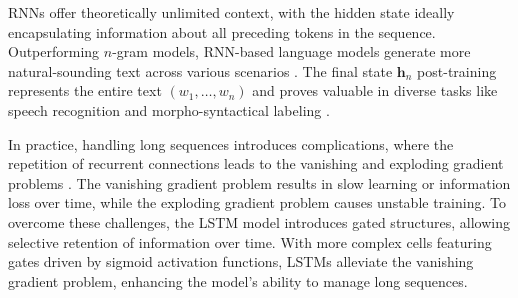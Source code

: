 




\acp{RNN} offer theoretically unlimited context, with the hidden state ideally encapsulating information about all preceding tokens in the sequence. Outperforming $n$-gram models, \ac{RNN}-based language models generate more natural-sounding text across various scenarios \citep{mikolov2010recurrent, kovavcevic2022bidirectional}. The final state $\bm{h}_{n}$ post-training represents the entire text $(w_1, \ldots, w_n)$ and proves valuable in diverse tasks like speech recognition \citep{schwenk2007continuous} and morpho-syntactical labeling \citep{collobert2011deep}.

In practice, handling long sequences introduces complications, where the repetition of recurrent connections leads to the vanishing and exploding gradient problems \citep{hochreiter2001gradient}. The vanishing gradient problem results in slow learning or information loss over time, while the exploding gradient problem causes unstable training. To overcome these challenges, the \ac{LSTM} model \citep{hochreiter1997long} introduces gated structures, allowing selective retention of information over time.  With more complex cells featuring gates driven by sigmoid activation functions, \acp{LSTM} alleviate the vanishing gradient problem, enhancing the model's ability to manage long sequences.


